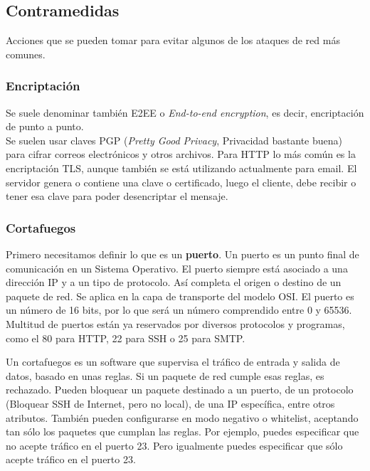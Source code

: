 \documentclass[a4paper, 11pt]{report} %
\begin{document}
\newpage
\subsection{Contramedidas}
Acciones que se pueden tomar para evitar algunos de los ataques de red más comunes.
\subsubsection{Encriptación}
Se suele denominar también E2EE o \textit{End-to-end encryption}, es decir, encriptación de punto a punto.\\
Se suelen usar claves PGP (\textit{Pretty Good Privacy}, Privacidad bastante buena) para cifrar correos electrónicos y otros archivos. Para HTTP lo más común es la encriptación TLS, aunque también se está utilizando actualmente para email. El servidor genera o contiene una clave o certificado, luego el cliente, debe recibir o tener esa clave para poder desencriptar el mensaje.
\subsubsection{Cortafuegos}
Primero necesitamos definir lo que es un \textbf{puerto}. Un puerto es un punto final de comunicación en un Sistema Operativo. El puerto siempre está asociado a una dirección IP y a un tipo de protocolo. Así completa el origen o destino de un paquete de red. Se aplica en la capa de transporte del modelo OSI. El puerto es un número de 16 bits, por lo que será un número comprendido entre 0 y 65536. Multitud de puertos están ya reservados por diversos protocolos y programas, como el 80 para HTTP, 22 para SSH o 25 para SMTP.

Un cortafuegos es un software que supervisa el tráfico de entrada y salida de datos, basado en unas reglas. Si un paquete de red cumple esas reglas, es rechazado. Pueden bloquear un paquete destinado a un puerto, de un protocolo (Bloquear SSH de Internet, pero no local), de una IP específica, entre otros atributos. También pueden configurarse en modo negativo o whitelist, aceptando tan sólo los paquetes que cumplan las reglas. Por ejemplo, puedes especificar que no acepte tráfico en el puerto 23. Pero igualmente puedes especificar que sólo acepte tráfico en el puerto 23.

\end{document}
